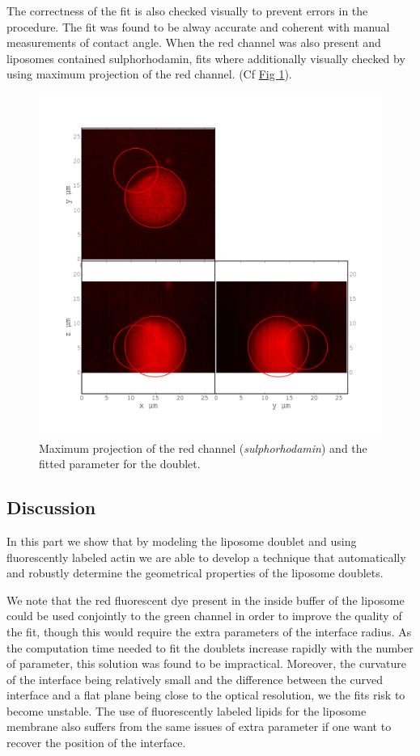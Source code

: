 \documentclass[A4paperpaper,11pt,english]{sphinxmanual}
\begin{document}
The correctness of the fit is also checked visually to prevent errors in the
procedure.  The fit was found to be alway accurate and coherent with manual
measurements of contact angle.  When the red channel was also present and liposomes
contained sulphorhodamin, fits where additionally visually checked by using maximum
projection of the red channel.  (Cf \hyperref[parts/part4:srhod]{Fig  \ref*{parts/part4:srhod}}).
\begin{figure}[htbp]
\centering
\capstart

\includegraphics[width=0.800\linewidth]{srhod_superimpose.png}
\caption{Maximum projection of the red channel (\emph{sulphorhodamin}) and the fitted
parameter for the doublet.}\label{parts/part4:srhod}\end{figure}


\subsection{Discussion}
\label{parts/part4:id24}
In this part we show that by modeling the liposome doublet and using
fluorescently labeled actin we are able to develop a technique that
automatically and robustly determine the geometrical properties of the liposome
doublets.

We note that the red fluorescent dye present in the inside buffer of the
liposome could be used conjointly to the green channel in order to improve the
quality of the fit, though this would require the extra parameters of the
interface radius. As the computation time needed to fit the doublets increase
rapidly with the number of parameter, this solution was found to be
impractical.  Moreover, the curvature of the interface being relatively small
and the difference between the curved interface and a flat plane being close to
the optical resolution, we the fits risk to become unstable.  The use of
fluorescently labeled lipids for the liposome membrane also suffers from the
same issues of extra parameter if one want to recover the position of the
interface.
\end{document}
